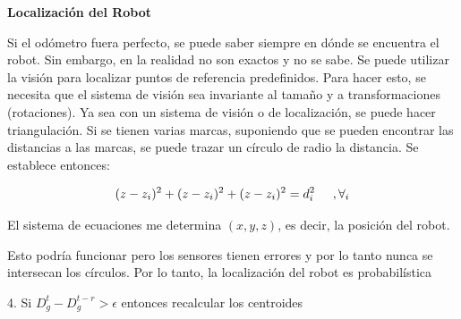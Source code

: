 \textbf{Localización del Robot}


Si el odómetro fuera perfecto, se puede saber siempre en dónde se encuentra el robot. Sin embargo, en la
realidad no son exactos y no se sabe.
Se puede utilizar la visión para localizar puntos de referencia predefinidos.
Para hacer esto, se necesita que el sistema de visión sea invariante al tamaño y a transformaciones
(rotaciones).
Ya sea con un sistema de visión o de localización, se puede hacer triangulación.
Si se tienen varias marcas, suponiendo que se pueden encontrar las distancias a las marcas, se puede trazar un
círculo de radio la distancia.
Se establece entonces:

$$(z-z_i)^2 + (z-z_i)^2 + (z-z_i)^2 =d_{i}^2 \hspace{0.5cm} ,   \forall_i$$

El sistema de ecuaciones me determina $(x , y , z)$, es decir, la posición del robot.

Esto podría funcionar pero los sensores tienen errores y por lo tanto nunca se intersecan los círculos.
Por lo tanto, la localización del robot es probabilística

4. Si $D_{g}^t - D_{g}^{t-r} > \epsilon $ entonces recalcular los centroides




